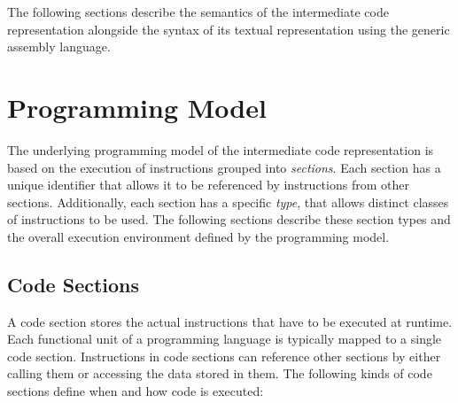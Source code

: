 The following sections describe the semantics of the intermediate code representation alongside the syntax of its textual representation using the generic assembly language.
\seeassembly\seedebugging

\section{Programming Model}\label{sec:cdprogrammingmodel}

The underlying programming model of the intermediate code representation is based on the execution of instructions grouped into \emph{sections}.
Each section has a unique identifier that allows it to be referenced by instructions from other sections.
Additionally, each section has a specific \emph{type}, that allows distinct classes of instructions to be used.
The following sections describe these section types and the overall execution environment defined by the programming model.

\subsection{Code Sections}

A code section stores the actual instructions that have to be executed at runtime.
Each functional unit of a programming language is typically mapped to a single code section.
Instructions in code sections can reference other sections by either calling them or accessing the data stored in them.
The following kinds of code sections define when and how code is executed:

